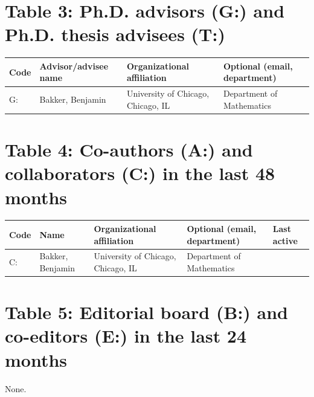 \documentclass[11pt]{article}
\begin{document}
\section*{Table 3: Ph.D. advisors (G:) and Ph.D. thesis advisees (T:)}

\begin{tabularx}{\textwidth}{@{}llXl@{}}
\toprule
Code & Advisor/advisee name & Organizational affiliation & Optional (email, department) \\
\midrule
G: & Bakker, Benjamin & University of Chicago, Chicago, IL & Department of Mathematics \\
\bottomrule
\end{tabularx}

\section*{Table 4: Co-authors (A:) and collaborators (C:) in the last 48 months}

\begin{tabularx}{\textwidth}{@{}llXll@{}}
\toprule
Code & Name & Organizational affiliation & Optional (email, department) & Last active \\
\midrule
C: & Bakker, Benjamin & University of Chicago, Chicago, IL & Department of Mathematics & \\
\bottomrule
\end{tabularx}

\section*{Table 5: Editorial board (B:) and co-editors (E:) in the last 24 months}

None.
\end{document}
